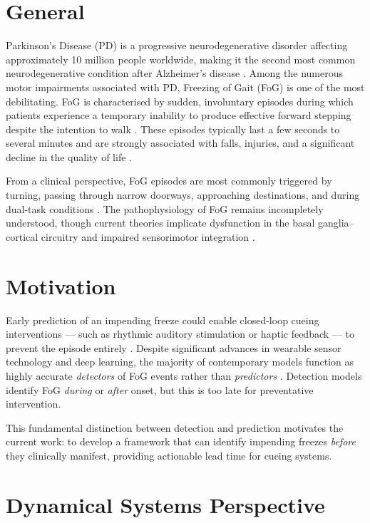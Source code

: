 \documentclass[12pt,a4paper,oneside]{report}
\numberwithin{equation}{chapter}
\numberwithin{figure}{chapter}
\numberwithin{table}{chapter}
\begin{document}
\section{General}

Parkinson's Disease (PD) is a progressive neurodegenerative disorder affecting approximately 10 million people worldwide, making it the second most common neurodegenerative condition after Alzheimer's disease \cite{nutt2011}. Among the numerous motor impairments associated with PD, Freezing of Gait (FoG) is one of the most debilitating. FoG is characterised by sudden, involuntary episodes during which patients experience a temporary inability to produce effective forward stepping despite the intention to walk \cite{nutt2011, okuma2014}. These episodes typically last a few seconds to several minutes and are strongly associated with falls, injuries, and a significant decline in the quality of life \cite{heremans2013}.

From a clinical perspective, FoG episodes are most commonly triggered by turning, passing through narrow doorways, approaching destinations, and during dual-task conditions \cite{plotnik2008}. The pathophysiology of FoG remains incompletely understood, though current theories implicate dysfunction in the basal ganglia--cortical circuitry and impaired sensorimotor integration \cite{nutt2011}.

\section{Motivation}

Early prediction of an impending freeze could enable closed-loop cueing interventions --- such as rhythmic auditory stimulation or haptic feedback --- to prevent the episode entirely \cite{sweeney2019, mancini2021}. Despite significant advances in wearable sensor technology and deep learning, the majority of contemporary models function as highly accurate \textit{detectors} of FoG events rather than \textit{predictors} \cite{sigcha2022, hasan2023}. Detection models identify FoG \textit{during} or \textit{after} onset, but this is too late for preventative intervention.

This fundamental distinction between detection and prediction motivates the current work: to develop a framework that can identify impending freezes \textit{before} they clinically manifest, providing actionable lead time for cueing systems.

\section{Dynamical Systems Perspective}
\end{document}
